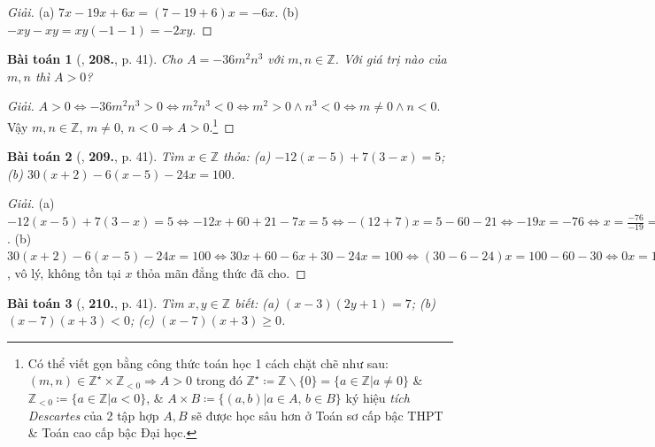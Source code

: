 \documentclass{article}
\numberwithin{equation}{section}
\newtheorem{baitoan}{Bài toán}
\begin{document}
\begin{proof}[Giải]
	(a) $7x - 19x + 6x = (7 - 19 + 6)x = -6x$. (b) $-xy - xy = xy(-1 - 1) = -2xy$.
\end{proof}

\begin{baitoan}[\cite{Tuyen_Toan_6}, \textbf{208.}, p. 41]
	Cho $A = -36m^2n^3$ với $m,n\in\mathbb{Z}$. Với giá trị nào của $m,n$ thì $A > 0$?
\end{baitoan}

\begin{proof}[Giải]
	$A > 0\Leftrightarrow-36m^2n^3 > 0\Leftrightarrow m^2n^3 < 0\Leftrightarrow m^2 > 0\land n^3 < 0\Leftrightarrow m\ne0\land n < 0$. Vậy $m,n\in\mathbb{Z}$, $m\ne0$, $n < 0\Rightarrow A > 0$.\footnote{Có thể viết gọn bằng công thức toán học 1 cách chặt chẽ như sau: $(m,n)\in\mathbb{Z}^\star\times\mathbb{Z}_{< 0}\Rightarrow A > 0$ trong đó $\mathbb{Z}^\star\coloneqq\mathbb{Z}\backslash\{0\} = \{a\in\mathbb{Z}|a\ne 0\}$ \& $\mathbb{Z}_{< 0}\coloneqq\{a\in\mathbb{Z}|a < 0\}$, \& $A\times B\coloneqq\{(a,b)|a\in A,\,b\in B\}$ ký hiệu \textit{tích Descartes} của 2 tập hợp $A,B$ sẽ được học sâu hơn ở Toán sơ cấp bậc THPT \& Toán cao cấp bậc Đại học.} 
\end{proof}

\begin{baitoan}[\cite{Tuyen_Toan_6}, \textbf{209.}, p. 41]
	Tìm $x\in\mathbb{Z}$ thỏa: (a) $-12(x - 5) + 7(3 - x) = 5$; (b) $30(x + 2) - 6(x - 5) - 24x = 100$.
\end{baitoan}

\begin{proof}[Giải]
	(a) $-12(x - 5) + 7(3 - x) = 5\Leftrightarrow-12x + 60 + 21 - 7x = 5\Leftrightarrow-(12 + 7)x = 5 - 60 - 21\Leftrightarrow-19x = -76\Leftrightarrow x = \frac{-76}{-19} = 4$. (b) $30(x + 2) - 6(x - 5) - 24x = 100\Leftrightarrow 30x + 60 - 6x + 30 - 24x = 100\Leftrightarrow(30 - 6 - 24)x = 100 - 60 - 30\Leftrightarrow0x = 10\Leftrightarrow0 = 10$, vô lý, không tồn tại $x$ thỏa mãn đẳng thức đã cho.
\end{proof}

\begin{baitoan}[\cite{Tuyen_Toan_6}, \textbf{210.}, p. 41]
	Tìm $x,y\in\mathbb{Z}$ biết: (a) $(x - 3)(2y + 1) = 7$; (b) $(x - 7)(x + 3) < 0$; (c) $(x - 7)(x + 3)\ge0$.
\end{baitoan}
\end{document}
